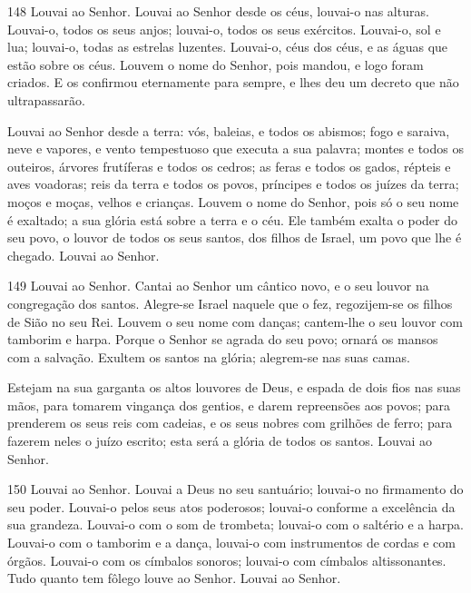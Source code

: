 \bigskip

\lettrine{148}{} Louvai ao Senhor. Louvai ao Senhor desde os
céus, louvai-o nas alturas. Louvai-o, todos os seus anjos;
louvai-o, todos os seus exércitos. Louvai-o, sol e lua;
louvai-o, todas as estrelas luzentes. Louvai-o, céus dos céus, e
as águas que estão sobre os céus. Louvem o nome do Senhor, pois
mandou, e logo foram criados. E os confirmou eternamente para
sempre, e lhes deu um decreto que não ultrapassarão.

Louvai ao Senhor desde a terra: vós, baleias, e todos os abismos;
fogo e saraiva, neve e vapores, e vento tempestuoso que executa
a sua palavra; montes e todos os outeiros, árvores frutíferas e
todos os cedros; as feras e todos os gados, répteis e aves
voadoras; reis da terra e todos os povos, príncipes e todos
os juízes da terra; moços e moças, velhos e crianças.
Louvem o nome do Senhor, pois só o seu nome é exaltado; a sua
glória está sobre a terra e o céu. Ele também exalta o poder
do seu povo, o louvor de todos os seus santos, dos filhos de Israel,
um povo que lhe é chegado. Louvai ao Senhor.

\bigskip

\lettrine{149}{} Louvai ao Senhor. Cantai ao Senhor um cântico
novo, e o seu louvor na congregação dos santos. Alegre-se Israel
naquele que o fez, regozijem-se os filhos de Sião no seu Rei.
Louvem o seu nome com danças; cantem-lhe o seu louvor com
tamborim e harpa. Porque o Senhor se agrada do seu povo; ornará
os mansos com a salvação. Exultem os santos na glória;
alegrem-se nas suas camas.

Estejam na sua garganta os altos louvores de Deus, e espada de
dois fios nas suas mãos, para tomarem vingança dos gentios, e
darem repreensões aos povos; para prenderem os seus reis com
cadeias, e os seus nobres com grilhões de ferro; para fazerem
neles o juízo escrito; esta será a glória de todos os santos. Louvai
ao Senhor.

\bigskip

\lettrine{150}{} Louvai ao Senhor. Louvai a Deus no seu
santuário; louvai-o no firmamento do seu poder. Louvai-o pelos
seus atos poderosos; louvai-o conforme a excelência da sua grandeza.
Louvai-o com o som de trombeta; louvai-o com o saltério e a
harpa. Louvai-o com o tamborim e a dança, louvai-o com
instrumentos de cordas e com órgãos. Louvai-o com os címbalos
sonoros; louvai-o com címbalos altissonantes. Tudo quanto tem
fôlego louve ao Senhor. Louvai ao Senhor.


